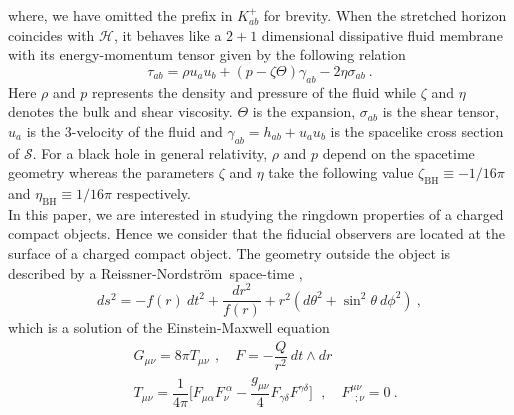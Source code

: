\documentclass[aps,prd,twocolumn,floatfix,noshowpacs,tightenlines,noshowkeys,superscriptaddress,amsmath,amssymb,
nofootinbib]{revtex4-1}
\renewcommand\[{\begin{equation}}
\renewcommand\]{\end{equation}}
\def\RN{Reissner-Nordstr\"{o}m}
\begin{document}
where, we have omitted the prefix in $K^{+}_{ab}$ for brevity. When the stretched horizon coincides with $\mathcal{H}$, it behaves like a $2+1$ dimensional dissipative fluid membrane with its energy-momentum tensor given by the following relation \cite{PhysRevD.58.064011, Maggio:2020jml,Chatterjee:2010gp, PhysRevD.95.064036}
\begin{equation}\label{ST_tensor}
\tau_{ab}=\rho u_a u_b+(p-\zeta \Theta)\gamma_{ab}-2\eta \sigma_{ab}~.
\end{equation}
Here $\rho$  and $p$ represents the density and pressure of the fluid while $\zeta$ and $\eta$ denotes the bulk and shear viscosity. $\Theta$ is the expansion, $\sigma_{ab}$ is the shear tensor, $u_a$ is the 3-velocity of the fluid and $\gamma_{ab}=h_{ab}+u_a u_b$ is the spacelike cross section of $\mathcal{S}$. For a black hole in general relativity, $\rho$ and $p$ depend on the spacetime geometry whereas the parameters $\zeta$ and $\eta$ take the following value $\zeta_{\textrm{BH}}\equiv -1/16\pi$ and $\eta_{\textrm{BH}}\equiv 1/16\pi$ respectively. \\
 In this paper, we are interested in studying the ringdown properties of a charged compact objects. Hence we consider that the fiducial observers are located at the surface of a charged compact object. The geometry outside the object is described by a \RN\ space-time \cite{Wald:1984rg,Chandrasekhar:1985kt,Hobson:2006se,Poisson:2009pwt},
\begin{equation}\label{rn_bh}
ds^{2}=-f(r)~dt^{2}+\frac{dr^{2}}{f(r)}+r^{2}(d\theta^{2}+\sin^{2}{\theta}~d\phi^{2})~,    
\end{equation}
which is a solution of the Einstein-Maxwell equation
\begin{eqnarray}\label{Ein_Max_Unpert}
&{G}_{\mu\nu}=8\pi T_{\mu\nu}~\,,\quad{F}=-\dfrac{Q}{r^2}~dt\wedge dr\\
 &T_{\mu\nu}=\dfrac{1}{4\pi}\bigg[{F}_{\mu\alpha}{F}_{\nu}^{~\alpha}-\dfrac{g_{\mu\nu}}{4}{F}_{\gamma\delta}{F}^{\gamma\delta}\bigg]~ ~\,,\quad{F^{\mu\nu}_{~~;\nu}}=0~.
\end{eqnarray}
\end{document}
